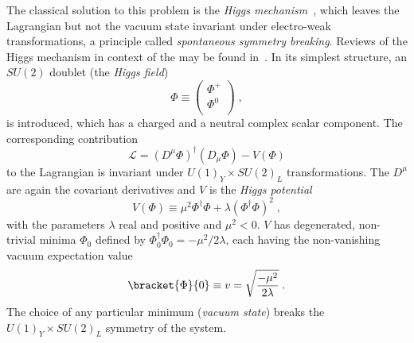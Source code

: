 The classical solution to this problem is the \emph{Higgs mechanism}~\cite{PhysRevLett.13.508,PhysRevLett.13.321,PhysRevLett.13.585}, which leaves the Lagrangian but not the vacuum state invariant under electro-weak transformations, a principle called \emph{spontaneous symmetry breaking}.
Reviews of the Higgs mechanism in context of the \sm may be found in~\cite{bib:PDG:2010:Higgs,bib:Schmuser:FeynmanGraphs,bib:AitchisonHey:GaugeTheories2}.
In its simplest structure, an $SU(2)$ doublet (the \emph{Higgs field})
\begin{equation*}
  \Phi \equiv \begin{pmatrix} \Phi^{+} \\ \Phi^{0} \\ \end{pmatrix} \;,
\end{equation*}
is introduced, which has a charged and a neutral complex scalar component.
The corresponding contribution
\begin{equation}\label{eq:Theory:SM:EWSB:LHiggs}
  \mathcal{L} = \left(D^{\mu}\Phi\right)^{\dagger}\left(D_{\mu}\Phi\right) - V(\Phi)
\end{equation}
to the Lagrangian is invariant under \mbox{$U(1)_{Y}\times SU(2)_{L}$} transformations.
The $D^{\mu}$ are again the covariant derivatives and $V$ is the \emph{Higgs potential}
\begin{equation*}
  V(\Phi) \equiv \mu^{2}\Phi^{\dagger}\Phi + \lambda\left(\Phi^{\dagger}\Phi\right)^{2} \;,
\end{equation*}
with the parameters $\lambda$ real and positive and \mbox{$\mu^{2}<0$}.
$V$ has degenerated, non-trivial minima $\Phi_{0}$ defined by \mbox{$\Phi_{0}^{\dagger}\Phi_{0} = -\mu^{2}/2\lambda$}, each having the non-vanishing vacuum expectation value
\begin{equation*}
  \bracket{\Phi}{0} \equiv v = \sqrt{\frac{-\mu^{2}}{2\lambda}} \;.
\end{equation*}
The choice of any particular minimum (\emph{vacuum state}) breaks the \mbox{$U(1)_{Y}\times SU(2)_{L}$} symmetry of the system.

